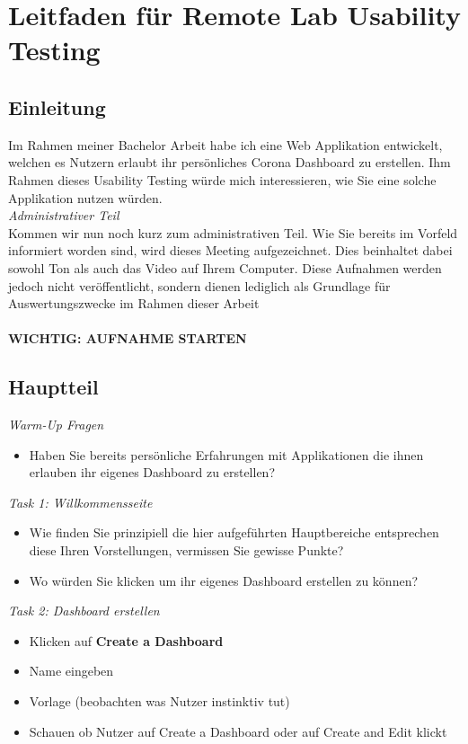 \section{Leitfaden für Remote Lab Usability Testing}

\subsection{Einleitung}
Im Rahmen meiner Bachelor Arbeit habe ich eine Web Applikation entwickelt, welchen es Nutzern erlaubt ihr persönliches Corona Dashboard zu erstellen. Ihm Rahmen dieses Usability Testing würde mich interessieren, wie Sie eine solche Applikation nutzen würden.
\\

\textit{Administrativer Teil}
\\
Kommen wir nun noch kurz zum administrativen Teil. Wie Sie bereits im Vorfeld informiert worden sind, wird dieses Meeting aufgezeichnet. Dies beinhaltet dabei sowohl Ton als auch das Video auf Ihrem Computer. Diese Aufnahmen werden jedoch nicht veröffentlicht, sondern dienen lediglich als Grundlage für Auswertungszwecke im Rahmen dieser Arbeit\\\\
\textbf{WICHTIG: AUFNAHME STARTEN}


\clearpage
\subsection{Hauptteil}

\textit{Warm-Up Fragen}
\begin{itemize}
    \item Haben Sie bereits persönliche Erfahrungen mit Applikationen die ihnen erlauben ihr eigenes Dashboard zu erstellen?
\end{itemize}

\textit{Task 1: Willkommensseite}
\begin{itemize}
    \item Wie finden Sie prinzipiell die hier aufgeführten Hauptbereiche entsprechen diese Ihren Vorstellungen, vermissen Sie gewisse Punkte?
    \item Wo würden Sie klicken um ihr eigenes Dashboard erstellen zu können?
\end{itemize}

\textit{Task 2: Dashboard erstellen}
\begin{itemize}
    \item Klicken auf \textbf{Create a Dashboard}
    \item Name eingeben
    \item Vorlage (beobachten was Nutzer instinktiv tut)
    \item Schauen ob Nutzer auf Create a Dashboard oder auf Create and Edit klickt
\end{itemize}

